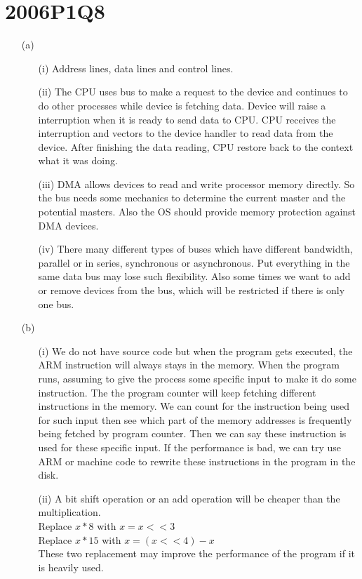 \documentclass[10pt,twoside,a4paper]{article}
\begin{document}
\section{2006P1Q8}
\begin{itemize}
\item[(a)]
\begin{itemize}
\item[(i)]
Address lines, data lines and control lines.
\item[(ii)]
The CPU uses bus to make a request to the device and continues to do other processes while device is fetching data. Device will raise a interruption when it is ready to send data to CPU. CPU receives the interruption and vectors to the device handler to read data from the device. After finishing the data reading, CPU restore back to the context what it was doing.
\item[(iii)]
DMA allows devices to read and write processor memory directly. So the bus needs some mechanics to determine the current master and the potential masters. Also the OS should provide memory protection against DMA devices.
\item[(iv)]
There many different types of buses which have different bandwidth, parallel or in series, synchronous or asynchronous. Put everything in the same data bus may lose such flexibility. Also some times we want to add or remove devices from the bus, which will be restricted if there is only one bus.
\end{itemize}
\item[(b)]
\begin{itemize}
\item[(i)]
We do not have source code but when the program gets executed, the ARM instruction will always stays in the memory. When the program runs, assuming to give the process some specific input to make it do some instruction. The the program counter will keep fetching different instructions in the memory. We can count for the instruction being used for such input then see which part of the memory addresses is frequently being fetched by program counter. Then we can say these instruction is used for these specific input. If the performance is bad, we can try use ARM or machine code to rewrite these instructions in the program in the disk.
\item[(ii)]
A bit shift operation or an add operation will be cheaper than the multiplication.
\\Replace $x*8$ with $x=x<<3$
\\Replace $x*15$ with $x=(x<<4) - x$
\\These two replacement may improve the performance of the program if it is heavily used.
\end{itemize}
\end{itemize}
\end{document}
